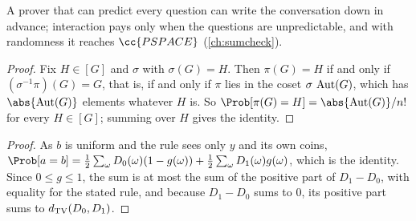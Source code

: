 \begin{refsection}
A prover that can predict every question can write the conversation down in advance; interaction pays only when the questions are unpredictable, and with randomness it reaches $\cc{PSPACE}$ (\cref{ch:sumcheck}).


\begin{proof}
Fix $H\in[G]$ and $\sigma$ with $\sigma(G)=H$. Then $\pi(G)=H$ if and only if $(\sigma^{-1}\pi)(G)=G$, that is, if and only if $\pi$ lies in the coset $\sigma\,\operatorname{Aut}(G)$, which has $\abs{\interactionaut(G)}$ elements whatever $H$ is. So $\Prob[\pi(G)=H]=\abs{\interactionaut(G)}/n!$ for every $H\in[G]$; summing over $H$ gives the identity.
\end{proof}


\begin{proof}
As $b$ is uniform and the rule sees only $y$ and its own coins, $\Prob[a=b]=\frac12\sum_\omega D_0(\omega)(1-g(\omega))+\frac12\sum_\omega D_1(\omega)g(\omega)$, which is the identity. Since $0\le g\le1$, the sum is at most the sum of the positive part of $D_1-D_0$, with equality for the stated rule, and because $D_1-D_0$ sums to $0$, its positive part sums to $d_{\mathrm{TV}}(D_0,D_1)$.
\end{proof}


\end{refsection}
